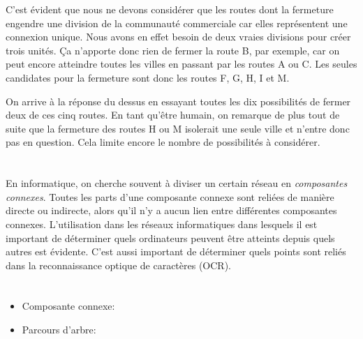 {{{\centering%
\par}

C’est évident que nous ne devons considérer que les routes dont la fermeture engendre une division de la communauté commerciale car elles représentent une connexion unique. Nous avons en effet besoin de deux vraies divisions pour créer trois unités. Ça n’apporte donc rien de fermer la route B, par exemple, car on peut encore atteindre toutes les villes en passant par les routes A ou C. Les seules candidates pour la fermeture sont donc les routes F, G, H, I et M.

On arrive à la réponse du dessus en essayant toutes les dix possibilités de fermer deux de ces cinq routes. En tant qu’être humain, on remarque de plus tout de suite que la fermeture des routes H ou M isolerait une seule ville et n’entre donc pas en question. Cela limite encore le nombre de possibilités à considérer.



\section*{\BrochureItsInformatics}
En informatique, on cherche souvent à diviser un certain réseau en \emph{composantes connexes}. Toutes les parts d’une composante connexe sont reliées de manière directe ou indirecte, alors qu’il n’y a aucun lien entre différentes composantes connexes. L’utilisation dans les réseaux informatiques dans lesquels il est important de déterminer quels ordinateurs peuvent être atteints depuis quels autres est évidente. C’est aussi important de déterminer quels points sont reliés dans la reconnaissance optique de caractères (OCR).



\section*{\BrochureWebsitesAndKeywords}
{\raggedright
\begin{itemize}
  \item Composante connexe: \href{https://fr.wikipedia.org/wiki/Graphe_connexe}{}
  \item Parcours d’arbre: \href{https://fr.wikipedia.org/wiki/Parcours_d\%27arbre}{}
\end{itemize}


}}}
